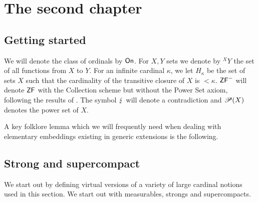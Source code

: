 \documentclass[../main]{subfiles}
\begin{document}
\chapter{The second chapter}
\label{ch1}
\thispagestyle{fancy}

\section{Getting started}

We will denote the class of ordinals by $\textsf{On}$. For $X,Y$ sets we denote by ${^X}Y$ the set of all functions from $X$ to $Y$. For an infinite cardinal $\kappa$, we let $H_\kappa$ be the set of sets $X$ such that the cardinality of the transitive closure of $X$ is ${<}\kappa$. $\textsf{ZF}^-$ will denote $\textsf{ZF}$ with the Collection scheme but without the Power Set axiom, following the results of \cite{ZFwithoutPowerSet}. The symbol $\operatorname{\lightning}$ will denote a contradiction and $\mathscr P(X)$ denotes the power set of $X$.

\qquad A key folklore lemma which we will frequently need when dealing with elementary embeddings existing in generic extensions is the following.



\pagebreak
\section{Strong and supercompact}
\label{sect.strongsc}

We start out by defining virtual versions of a variety of large cardinal notions used in this section. We start out with measurables, strongs and supercompacts.
\end{document}
